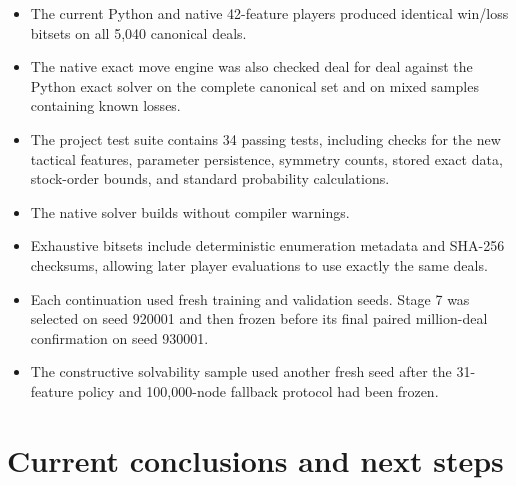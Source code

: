 \documentclass[11pt]{article}
\begin{document}
\begin{itemize}
  \item The current Python and native 42-feature players produced identical win/loss bitsets on all 5,040 canonical \texttt{} deals.
  \item The native exact move engine was also checked deal for deal against the Python exact solver on the complete canonical \texttt{} set and on mixed \texttt{} samples containing known losses.
  \item The project test suite contains 34 passing tests, including checks for the new tactical features, parameter persistence, symmetry counts, stored exact data, stock-order bounds, and standard probability calculations.
  \item The native solver builds without compiler warnings.
  \item Exhaustive bitsets include deterministic enumeration metadata and SHA-256 checksums, allowing later player evaluations to use exactly the same deals.
  \item Each continuation used fresh training and validation seeds. Stage 7 was selected on seed 920001 and then frozen before its final paired million-deal confirmation on seed 930001.
  \item The constructive solvability sample used another fresh seed after the 31-feature policy and 100,000-node fallback protocol had been frozen.
\end{itemize}

\section{Current conclusions and next steps}
\end{document}
